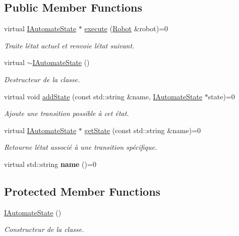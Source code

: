 \subsection*{Public Member Functions}
\begin{DoxyCompactItemize}
\item 
virtual \hyperlink{classIAutomateState}{I\+Automate\+State} $\ast$ \hyperlink{classIAutomateState_a58bf3c2c5b55f7ba3fc1783fc36e102b}{execute} (\hyperlink{classRobot}{Robot} \&robot)=0
\begin{DoxyCompactList}\small\item\em Traite l\textquotesingle{}état actuel et renvoie l\textquotesingle{}état suivant. \end{DoxyCompactList}\item 
\mbox{\label{classIAutomateState_a3f77f7f5b6503ebf9f9740f7b7c6bcda}} 
virtual \hyperlink{classIAutomateState_a3f77f7f5b6503ebf9f9740f7b7c6bcda}{$\sim$\+I\+Automate\+State} ()
\begin{DoxyCompactList}\small\item\em Destructeur de la classe. \end{DoxyCompactList}\item 
virtual void \hyperlink{classIAutomateState_a2d088c807e6d7b30b93511096a34af2a}{add\+State} (const std\+::string \&name, \hyperlink{classIAutomateState}{I\+Automate\+State} $\ast$state)=0
\begin{DoxyCompactList}\small\item\em Ajoute une transition possible à cet état. \end{DoxyCompactList}\item 
virtual \hyperlink{classIAutomateState}{I\+Automate\+State} $\ast$ \hyperlink{classIAutomateState_a228fe704fd235a83cae36e5dd197c473}{get\+State} (const std\+::string \&name)=0
\begin{DoxyCompactList}\small\item\em Retourne l\textquotesingle{}état associé à une transition spécifique. \end{DoxyCompactList}\item 
\mbox{\label{classIAutomateState_a11468bf9104e6574479588f0aacaabd3}} 
virtual std\+::string {\bfseries name} ()=0
\end{DoxyCompactItemize}
\subsection*{Protected Member Functions}
\begin{DoxyCompactItemize}
\item 
\mbox{\label{classIAutomateState_a9a2b971eb5ea06b77649e6becc846c24}} 
\hyperlink{classIAutomateState_a9a2b971eb5ea06b77649e6becc846c24}{I\+Automate\+State} ()
\begin{DoxyCompactList}\small\item\em Constructeur de la classe. \end{DoxyCompactList}\end{DoxyCompactItemize}


